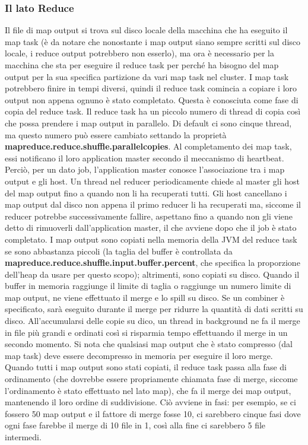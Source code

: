 \subsubsection{Il lato Reduce} 
Il file di map output si trova sul disco locale della macchina che ha eseguito il map task (è da notare che nonostante i map output siano sempre scritti sul disco locale, i reduce output potrebbero non esserlo), ma ora è necessario per la macchina che sta per eseguire il reduce task per perché ha bisogno del map output per la sua specifica partizione da vari map task nel cluster. I map task potrebbero finire in tempi diversi, quindi il reduce task comincia a copiare i loro output non appena ognuno è stato completato. Questa è conosciuta come fase di copia del reduce task. Il reduce task ha un piccolo numero di thread di copia così che possa prendere i map output in parallelo. Di default ci sono cinque thread, ma questo numero può essere cambiato settando la proprietà \textbf{mapreduce.reduce.shuffle.parallelcopies}. Al completamento dei map task, essi notificano il loro application master secondo il meccanismo di heartbeat. Perciò, per un dato job, l'application master conosce l'associazione tra i map output e gli host. Un thread nel reducer periodicamente chiede al master gli host del map output fino a quando non li ha recuperati tutti. Gli host cancellano i map output dal disco non appena il primo reducer li ha recuperati ma, siccome il reducer potrebbe successivamente fallire, aspettano fino a quando non gli viene detto di rimuoverli dall'application master, il che avviene dopo che il job è stato completato. I map output sono copiati nella memoria della JVM del reduce task se sono abbastanza piccoli (la taglia del buffer è controllata da \textbf{mapreduce.reduce.shuffle.input.buffer.percent}, che specifica la proporzione dell'heap da usare per questo scopo); altrimenti, sono copiati su disco. Quando il buffer in memoria raggiunge il limite di taglia o raggiunge un numero limite di map output, ne viene effettuato il merge e lo spill su disco. Se un combiner è specificato, sarà eseguito durante il merge per ridurre la quantità di dati scritti su disco. All'accumularsi delle copie su dico, un thread in background ne fa il merge in file più grandi e ordinati così si risparmia tempo effettuando il merge in un secondo momento. Si nota che qualsiasi map output che è stato compresso (dal map task) deve essere decompresso in memoria per eseguire il loro merge. Quando tutti i map output sono stati copiati, il reduce task passa alla fase di ordinamento (che dovrebbe essere propriamente chiamata fase di merge, siccome l'ordinamento è stato effettuato nel lato map), che fa il merge dei map output, mantenendo il loro ordine di suddivisione. Ciò avviene in fasi: per esempio, se ci fossero 50 map output e il fattore di merge fosse 10, ci sarebbero cinque fasi dove ogni fase farebbe il merge di 10 file in 1, così alla fine ci sarebbero 5 file intermedi.
